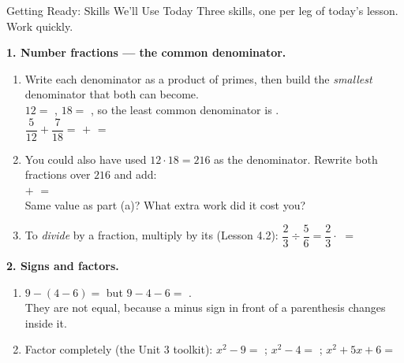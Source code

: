 \documentclass[10pt]{article}
\begin{document}
\namedateperiod

\vspace{0.10in}

\begin{notesbox}{Getting Ready: Skills We'll Use Today}
\small Three skills, one per leg of today's lesson. Work quickly.

\vspace{4pt}
\textbf{1. Number fractions --- the common denominator.}
\begin{enumerate}[label=(\alph*), leftmargin=2.1em, itemsep=3pt]
  \item Write each denominator as a product of primes, then build the \emph{smallest} denominator
        that both can become. \\[2pt]
        $12=$ , \quad $18=$ , \quad so the least common denominator is
        . \\[3pt]
        $\dfrac{5}{12}+\dfrac{7}{18}=$  $+$  $=$
  \item You could also have used $12\cdot18=216$ as the denominator. Rewrite both fractions over
        $216$ and add: \\[3pt]
         $+$  $=$  \\[3pt]
        Same value as part (a)?  \quad What extra work did it cost you?
  \item To \emph{divide} by a fraction, multiply by its  (Lesson 4.2):
        $\dfrac{2}{3}\div\dfrac{5}{6}=\dfrac{2}{3}\cdot$  $=$ 
\end{enumerate}

\vspace{4pt}
\textbf{2. Signs and factors.}
\begin{enumerate}[label=(\alph*), leftmargin=2.1em, itemsep=3pt]
  \item $9-(4-6)=$  \qquad but \qquad $9-4-6=$ . \\[2pt]
        They are not equal, because a minus sign in front of a parenthesis changes
         inside it.
  \item Factor completely (the Unit 3 toolkit): \; $x^2-9=$ ; \quad
        $x^2-4=$ ; \quad $x^2+5x+6=$ 
\end{enumerate}


\end{notesbox}
\end{document}
